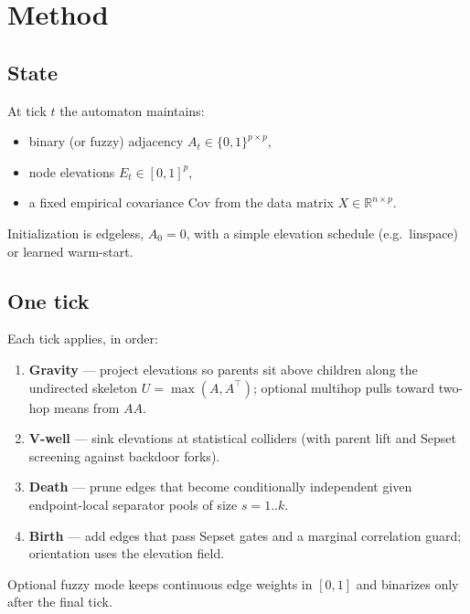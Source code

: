 \documentclass{article}
\begin{document}
\section{Method}
\label{sec:method}


\subsection{State}
At tick \(t\) the automaton maintains:
\begin{itemize}
  \item binary (or fuzzy) adjacency \(A_t\in\{0,1\}^{p\times p}\),
  \item node elevations \(E_t\in[0,1]^p\),
  \item a fixed empirical covariance \(\mathrm{Cov}\) from the data matrix
        \(X\in\mathbb{R}^{n\times p}\).
\end{itemize}
Initialization is edgeless, \(A_0=0\), with a simple elevation schedule
(e.g.\ linspace) or learned warm-start.

\subsection{One tick}
Each tick applies, in order:
\begin{enumerate}
  \item \textbf{Gravity} --- project elevations so parents sit above children
        along the undirected skeleton \(U=\max(A,A^\top)\); optional multihop
        pulls toward two-hop means from \(A A\).
  \item \textbf{V-well} --- sink elevations at statistical colliders (with
        parent lift and Sepset screening against backdoor forks).
  \item \textbf{Death} --- prune edges that become conditionally independent
        given endpoint-local separator pools of size \(s=1..k\).
  \item \textbf{Birth} --- add edges that pass Sepset gates and a marginal
        correlation guard; orientation uses the elevation field.
\end{enumerate}
Optional fuzzy mode keeps continuous edge weights in \([0,1]\) and binarizes
only after the final tick.
\end{document}
